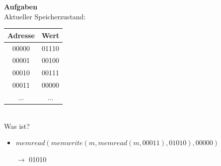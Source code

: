\begin{frame}
	\textbf{Aufgaben}\\
	Aktueller Speicherzustand: \\
	\vspace{0.2cm}
	\begin{tabular}{|c| c|}
		\hline
		Adresse & Wert\\
		\hline
		00000& 01110\\
		00001& 00100\\
		00010& 00111\\
		00011& 00000\\
		...& ...\\
		\hline
	\end{tabular}\\
	\vspace{0.3cm}
	Was ist?
	\begin{itemize}
		\item $memread(memwrite(m, memread(m, 00011), 01010), 00000)$ \pause
		\item[$\rightarrow$] 01010
	\end{itemize}
	
\end{frame}

